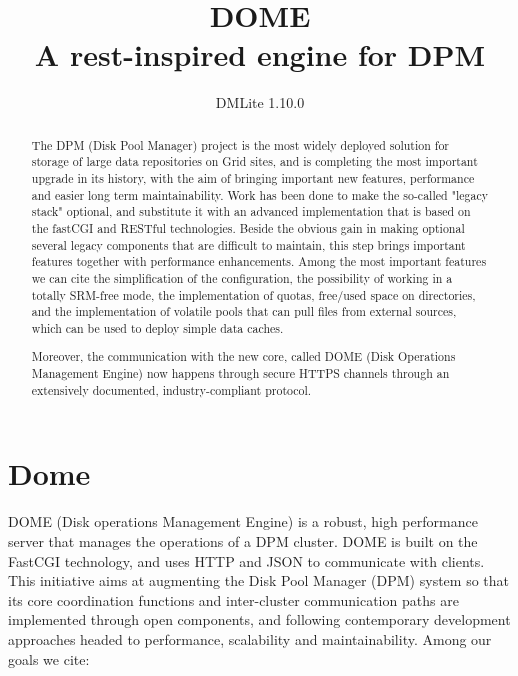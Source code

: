 \documentclass[a4paper,10pt]{scrreprt}
\title{DOME\\A rest-inspired engine for DPM}
\author{}
\subtitle{DMLite 1.10.0}
\begin{document}
\maketitle

\begin{abstract}


The DPM (Disk Pool Manager) project is the most widely deployed solution for storage of large
data repositories on Grid sites, and is completing the most important upgrade in its history,
with the aim of bringing important new features, performance and easier long term maintainability.
Work has been done to make the so-called "legacy stack" optional, and substitute it with
an advanced implementation that is based on the fastCGI and RESTful technologies.
Beside the obvious gain in making optional several legacy components that are difficult
to maintain, this step brings important features together with performance enhancements.
Among the most important features we can cite the simplification of the configuration,
the possibility of working in a totally SRM-free mode, the implementation of quotas,
free/used space on directories, and the implementation of volatile pools that
can pull files from external sources, which can be used to deploy simple data caches.

Moreover, the communication with the new core, called DOME (Disk Operations Management Engine)
now happens through secure HTTPS channels through an extensively documented,
industry-compliant protocol.

\end{abstract}



\newpage %



\tableofcontents %

\newpage %



\chapter{Dome}

DOME (Disk operations Management Engine) is a robust, high performance server that manages the operations of a DPM cluster. DOME is built on the FastCGI technology,
and uses HTTP and JSON to communicate with clients.
This initiative aims at augmenting the Disk Pool Manager (DPM) system so that its core coordination functions and inter-cluster communication paths are
implemented through open components, and following contemporary development approaches headed to performance, scalability and maintainability. Among our goals we cite:
\end{document}
